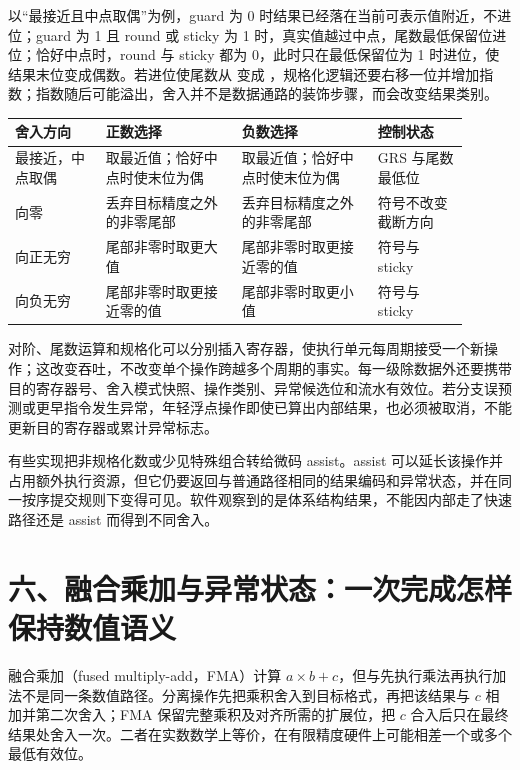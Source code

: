 以“最接近且中点取偶”为例，guard 为 0 时结果已经落在当前可表示值附近，不进位；guard 为 1 且 round 或 sticky 为 1 时，真实值越过中点，尾数最低保留位进位；恰好中点时，round 与 sticky 都为 0，此时只在最低保留位为 1 时进位，使结果末位变成偶数。若进位使尾数从  变成 ，规格化逻辑还要右移一位并增加指数；指数随后可能溢出，舍入并不是数据通路的装饰步骤，而会改变结果类别。

\begin{longtable}{L{0.18\linewidth}L{0.27\linewidth}L{0.27\linewidth}L{0.18\linewidth}}
\toprule
舍入方向 & 正数选择 & 负数选择 & 控制状态 \\
\midrule
最接近，中点取偶 & 取最近值；恰好中点时使末位为偶 & 取最近值；恰好中点时使末位为偶 & GRS 与尾数最低位 \\\tablerowrule
向零 & 丢弃目标精度之外的非零尾部 & 丢弃目标精度之外的非零尾部 & 符号不改变截断方向 \\\tablerowrule
向正无穷 & 尾部非零时取更大值 & 尾部非零时取更接近零的值 & 符号与 sticky \\\tablerowrule
向负无穷 & 尾部非零时取更接近零的值 & 尾部非零时取更小值 & 符号与 sticky \\
\bottomrule
\end{longtable}


对阶、尾数运算和规格化可以分别插入寄存器，使执行单元每周期接受一个新操作；这改变吞吐，不改变单个操作跨越多个周期的事实。每一级除数据外还要携带目的寄存器号、舍入模式快照、操作类别、异常候选位和流水有效位。若分支误预测或更早指令发生异常，年轻浮点操作即使已算出内部结果，也必须被取消，不能更新目的寄存器或累计异常标志。

有些实现把非规格化数或少见特殊组合转给微码 assist。assist 可以延长该操作并占用额外执行资源，但它仍要返回与普通路径相同的结果编码和异常状态，并在同一按序提交规则下变得可见。软件观察到的是体系结构结果，不能因内部走了快速路径还是 assist 而得到不同舍入。

\section{六、融合乘加与异常状态：一次完成怎样保持数值语义}

融合乘加（fused multiply-add，FMA）计算 \(a\times b+c\)，但与先执行乘法再执行加法不是同一条数值路径。分离操作先把乘积舍入到目标格式，再把该结果与 \(c\) 相加并第二次舍入；FMA 保留完整乘积及对齐所需的扩展位，把 \(c\) 合入后只在最终结果处舍入一次。二者在实数数学上等价，在有限精度硬件上可能相差一个或多个最低有效位。


